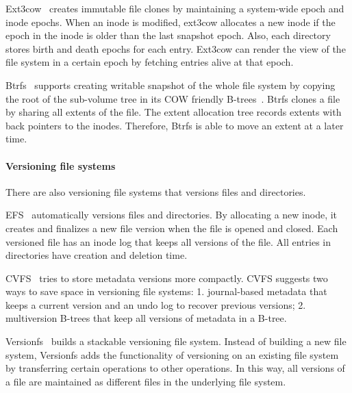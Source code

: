 Ext3cow~\citep{ext3cow} creates immutable file clones by maintaining a
system-wide epoch and inode epochs.
When an inode is modified, ext3cow allocates a new inode if the epoch in the
inode is older than the last snapshot epoch.
Also, each directory stores birth and death epochs for each entry.
Ext3cow can render the view of the file system in a certain epoch by fetching
entries alive at that epoch.

Btrfs~\citep{btrfs} supports creating writable snapshot of the whole file system
by copying the root of the sub-volume tree in its COW friendly
B-trees~\citep{cowbtree}.
Btrfs clones a file by sharing all extents of the file.
The extent allocation tree records extents with back pointers to the inodes.
Therefore, Btrfs is able to move an extent at a later time.

\paragraph{Versioning file systems}

There are also versioning file systems that versions files and directories.

EFS~\citep{efs} automatically versions files and directories.
By allocating a new inode, it creates and finalizes a new file version when the
file is opened and closed.
Each versioned file has an inode log that keeps all versions of the file.
All entries in directories have creation and deletion time.

CVFS~\citep{cvfs} tries to store metadata versions more compactly.
CVFS suggests two ways to save space in versioning file systems:
1. journal-based metadata that keeps a current version and an undo log to
recover previous versions;
2. multiversion B-trees that keep all versions of metadata in a B-tree.

Versionfs~\citep{versionfs} builds a stackable versioning file system.
Instead of building a new file system, Versionfs adds the functionality of
versioning on an existing file system by transferring certain operations to
other operations.
In this way, all versions of a file are maintained as different files in the
underlying file system.
